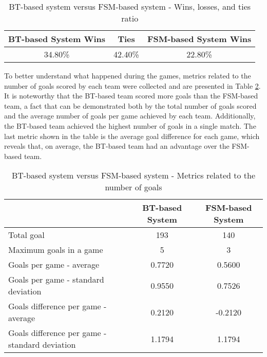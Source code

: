 \begin{table}[h]
    \centering
    \begin{tabular}{c c c}
        \toprule
        BT-based System Wins & Ties    & FSM-based System Wins \\
        \midrule
        34.80\%              & 42.40\% & 22.80\%               \\
        \bottomrule
    \end{tabular}
    \caption{BT-based system versus FSM-based system - Wins, losses, and ties ratio}
    \label{tab:wins}
\end{table}

To better understand what happened during the games, metrics related to the number of goals scored by each team were collected and are presented in Table \ref{tab:goals_number_metrics}. It is noteworthy that the BT-based team scored more goals than the FSM-based team, a fact that can be demonstrated both by the total number of goals scored and the average number of goals per game achieved by each team. Additionally, the BT-based team achieved the highest number of goals in a single match. The last metric shown in the table is the average goal difference for each game, which reveals that, on average, the BT-based team had an advantage over the FSM-based team.

\begin{table}[h]
    \centering
    \begin{tabular}{l c c}
        \toprule
                                                       & BT-based System & FSM-based System \\
        \midrule
        Total goal                                     & 193             & 140              \\
        Maximum goals in a game                        & 5               & 3                \\
        Goals per game - average                       & 0.7720          & 0.5600           \\
        Goals per game - standard deviation            & 0.9550          & 0.7526           \\
        Goals difference per game - average            & 0.2120          & -0.2120          \\
        Goals difference per game - standard deviation & 1.1794          & 1.1794           \\
        \bottomrule
    \end{tabular}
    \caption{BT-based system versus FSM-based system - Metrics related to the number of goals}
    \label{tab:goals_number_metrics}
\end{table}

